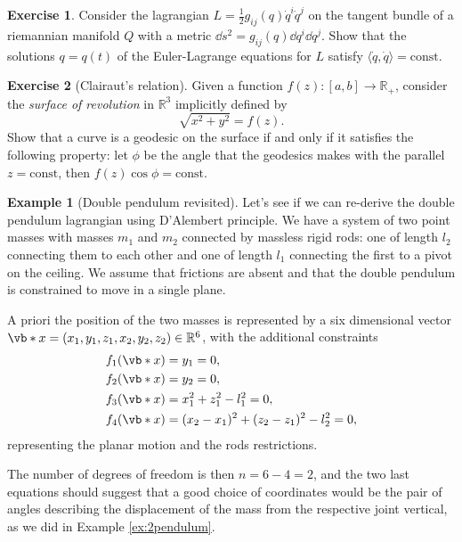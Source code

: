 \documentclass[english,fontsize=11pt,paper=b5]{scrbook}
\numberwithin{equation}{chapter}
\theoremstyle{definition}
\newtheorem{example}{Example}[chapter]
\newtheorem{exercise}{Exercise}[chapter]
\begin{document}
    \begin{exercise}
      Consider the lagrangian $L=\frac12 g_{ij}(q)\dot q^i \dot q^j$ on the tangent bundle of a riemannian manifold $Q$ with a metric $\dd s^2 = g_{ij}(q)\dd q^i \dd q^j$.
      Show that the solutions $q=q(t)$ of the Euler-Lagrange equations for $L$ satisfy $\langle\dot q, \dot q\rangle= \mathrm{const}$.
    \end{exercise}

    \begin{exercise}[Clairaut's relation]
      Given a function $f(z): [a,b] \to \mathbb{R}_+$, consider the \emph{surface of revolution} in $\mathbb{R}^3$ implicitly defined by
      \begin{equation}
        \sqrt{x^2 + y^2} = f(z).
      \end{equation}
      Show that a curve is a geodesic on the surface if and only if it satisfies the following property: let $\phi$ be the angle that the geodesics makes with the parallel $z=\mathrm{const}$, then $f(z)\cos \phi = \mathrm{const}$.
    \end{exercise}

    \begin{example}[Double pendulum revisited]
      Let's see if we can re-derive the double pendulum lagrangian using D'Alembert principle.
      We have a system of two point masses with masses $m_1$ and $m_2$ connected by massless rigid rods: one of length $l_2$ connecting them to each other and one of length $l_1$ connecting the first to a pivot on the ceiling. We assume that frictions are absent and that the double pendulum is constrained to move in a single plane.

      A priori the position of the two masses is represented by a six dimensional vector
      $\vb*{x} = (x_1, y_1, z_1, x_2, y_2, z_2)\in\mathbb{R}^6$, with the additional constraints
      \begin{align}
        f_1(\vb*{x}) & = y_1 = 0,                               \\
        f_2(\vb*{x}) & = y_2 = 0,                               \\
        f_3(\vb*{x}) & = x_1^2 + z_1^2 - l_1^2 = 0,             \\
        f_4(\vb*{x}) & = (x_2-x_1)^2 + (z_2-z_1)^2 - l_2^2 = 0,
      \end{align}
      representing the planar motion and the rods restrictions.

      The number of degrees of freedom is then $n = 6 -4 = 2$, and the two last equations should suggest that a good choice of coordinates would be the pair of angles describing the displacement of the mass from the respective joint vertical, as we did in Example \ref{ex:2pendulum}.
    \end{example}
\end{document}
